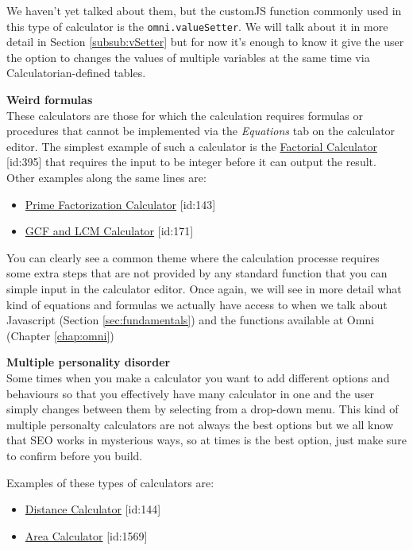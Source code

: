 We haven't yet talked about them, but the customJS function commonly used in this type of calculator is the \texttt{omni.valueSetter}. We will talk about it in more detail in Section \ref{subsub:vSetter} but for now it's enough to know it give the user the option to changes the values of multiple variables at the same time via Calculatorian-defined tables.

\textbf{Weird formulas}\\
\label{calc:weird}
These calculators are those for which the calculation requires formulas or procedures that cannot be implemented via the \textit{Equations} tab on the calculator editor. The simplest example of such a calculator is the \href{https://www.omnicalculator.com/all/factorial}{Factorial Calculator} [id:395] that requires the input to be integer before it can output the result. Other examples along the same lines are:
\begin{itemize}
    \item \href{https://www.omnicalculator.com/all/prime-factorization}{Prime Factorization Calculator} [id:143]
    \item \href{https://www.omnicalculator.com/all/gcf-and-lcm}{GCF and LCM Calculator} [id:171]
\end{itemize}

You can clearly see a common theme where the calculation processe requires some extra steps that are not provided by any standard function that you can simple input in the calculator editor. Once again, we will see in more detail what kind of equations and formulas we actually have access to when we talk about Javascript (Section \ref{sec:fundamentals}) and the functions available at Omni (Chapter \ref{chap:omni})

\textbf{Multiple personality disorder}\\
\label{calc:multiple}
Some times when you make a calculator you want to add different options and behaviours so that you effectively have many calculator in one and the user simply changes between them by selecting from a drop-down menu. This kind of multiple personalty calculators are not always the best options but we all know that SEO works in mysterious ways, so at times is the best option, just make sure to confirm before you build.

Examples of these types of calculators are:
\begin{itemize}
    \item \href{https://www.omnicalculator.com/all/distance}{Distance Calculator} [id:144]
    \item \href{https://www.omnicalculator.com/all/area}{Area Calculator} [id:1569]
\end{itemize}

